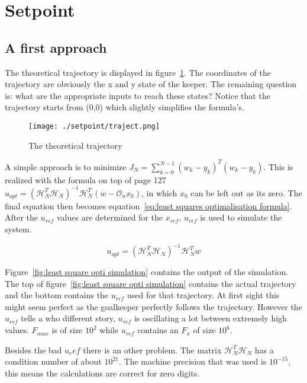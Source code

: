 \section{Setpoint}

\subsection{A first approach}

The theoretical trajectory is displayed in figure~\ref{fig:trajectory}. The coordinates of the trajectory are obviously the x and y state of the keeper. The remaining question is: what are the appropriate inputs to reach these states? Notice that the trajectory starts from (0,0) which slightly simplifies the formula's.

\begin{figure}[H]
	\centering
	\texttt{[image: ./setpoint/traject.png]}
	\caption{The theoretical trajectory}
	\label{fig:trajectory}
\end{figure}

A simple approach is to minimize $J_N = \sum_{k=0}^{N-1} (w_k-y_k)^T(w_k-y_k)$. This is realized with the formula on top of page 127 $u_{opt}=(\mathcal{H}_N^T\mathcal{H}_N)^{-1}\mathcal{H}_N^T(w-\mathcal{O}_nx_0)$, in which $x_0$ can be left out as its zero. The final equation then becomes equation~\ref{eq:least squares optimalisation formula}. After the $u_{ref}$ values are determined for the $x_{ref}$, $u_{ref}$ is used to simulate the system. 

\begin{equation}
u_{opt}=(\mathcal{H}_N^T\mathcal{H}_N)^{-1}\mathcal{H}_N^Tw
\label{eq:least squares optimalisation formula}
\end{equation}

Figure~\ref{fig:least square opti simulation} contains the output of the simulation. The top of figure~\ref{fig:least square opti simulation}  contains the actual trajectory and the bottom contains the $u_{ref}$ used for that trajectory. At first sight this might seem perfect as the goalkeeper perfectly follows the trajectory. However the $u_{ref}$ tells a who different story, $u_{ref}$ is oscillating a lot between extremely high values. $F_{max}$ is of size $10^2$ while $u_{ref}$ contains an $F_x$ of size $10^6$.

Besides the bad $u_ref$ there is an other problem. The matrix $\mathcal{H}_N^T\mathcal{H}_N$ has a condition number of about $10^{21}$. The machine precision that was used is $10^{-15}$, this means the calculations are correct for zero digits. 

